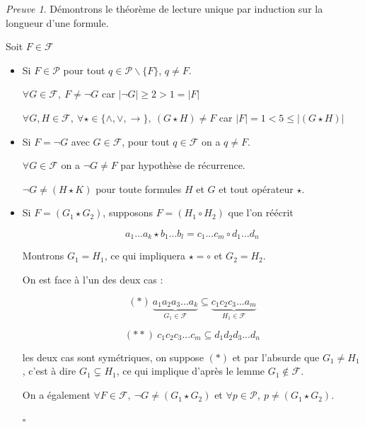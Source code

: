 \documentclass[]{article}
\theoremstyle{remark}
\newtheorem{myproof}{Preuve}
\theoremstyle{definition}
\newcommand{\cqfd}{
	\hfill$\square$
}
\begin{document}
\begin{myproof}
	Démontrons le théorème de lecture unique par induction sur la longueur d'une formule.
	
	Soit $F \in \mathcal{F}$
	
	\begin{itemize}
		\item Si $F \in \mathcal{P}$ pour tout $q \in \mathcal{P} \backslash \{F\}$, $q \neq F$.
		
		$\forall G \in \mathcal{F}, ~ F \neq \neg G$ car $|\neg G| \geqslant 2 > 1 = |F|$
		
		$\forall G, H \in \mathcal{F}, ~ \forall \star \in \{\land, \lor, \longrightarrow\}, ~ (G \star H) \neq F$ car $|F| = 1 < 5 \leqslant |(G \star H)|$
		
		\item Si $F=\neg G$ avec $G \in \mathcal{F}$, pour tout $q \in \mathcal{F}$ on a $q \neq F$.
		
		$\forall G \in \mathcal{F}$ on a $\neg G \neq F$ par hypothèse de récurrence.
		
		$\neg G \neq (H \star K)$ pour toute formules $H$ et $G$ et tout opérateur $\star$.
		
		\item Si $F=(G_1 \star G_2)$, supposons $F=(H_1 \circ H_2)$ que l'on réécrit
		
		$$a_1...a_k \star b_1...b_l = c_1...c_m \circ d_1...d_n$$
		
		Montrons $G_1 = H_1$, ce qui impliquera $\star = \circ$ et $G_2 = H_2$.
		
		On est face à l'un des deux cas :
		
		$$(*) ~ \underbrace{a_1 a_2 a_3 ...a_k}_{G_1 \in \mathcal{F}} \subseteq \underbrace{c_1 c_2 c_3 ...a_m}_{H_1 \in \mathcal{F}}$$
		
		$$(**) ~ c_1 c_2 c_3 ...c_m\subseteq d_1 d_2 d_3 ...d_n$$
		
		les deux cas sont symétriques, on suppose $(*)$ et par l'absurde que $G_1 \neq H_1$, c'est à dire $G_1 \subsetneq H_1$, ce qui implique d'après le lemme $G_1 \notin \mathcal{F}$.
		
		On a également $\forall F \in \mathcal{F}, ~ \neg G \neq (G_1 \star G_2)$ et $\forall p \in \mathcal{P}, ~ p \neq (G_1 \star G_2)$.
		
		\cqfd
	\end{itemize}
\end{myproof}
\end{document}
